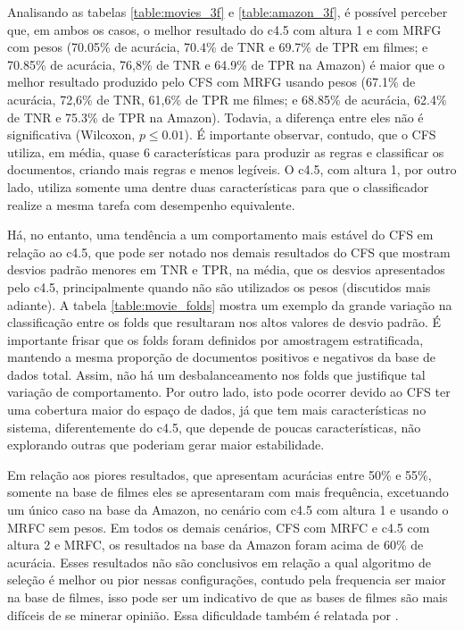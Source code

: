 \documentclass[template.tex]{subfiles}
\begin{document}
Analisando as tabelas \ref{table:movies_3f} e \ref{table:amazon_3f}, é possível perceber que, em ambos os casos, o melhor resultado do c4.5 com altura 1 e com MRFG com pesos (70.05\% de acurácia, 70.4\% de TNR e 69.7\% de TPR em filmes; e 70.85\% de acurácia, 76,8\% de TNR e 64.9\% de TPR na Amazon) é maior que o melhor resultado produzido pelo CFS com MRFG usando pesos (67.1\% de acurácia, 72,6\% de TNR, 61,6\% de TPR me filmes; e 68.85\% de acurácia, 62.4\% de TNR e 75.3\% de TPR na Amazon). Todavia, a diferença entre eles não é significativa (Wilcoxon, $p\leq0.01$). É importante observar, contudo, que o CFS utiliza, em média, quase 6 características para produzir as regras e classificar os documentos, criando mais regras e menos legíveis. O c4.5, com altura 1, por outro lado, utiliza somente uma dentre duas características para que o classificador realize a mesma tarefa com desempenho equivalente. 
 
Há, no entanto, uma tendência a um comportamento mais estável do CFS em relação ao c4.5, que pode ser notado nos demais resultados do CFS que mostram desvios padrão menores em TNR e TPR,  na média, que os desvios apresentados pelo c4.5, principalmente quando não são utilizados os pesos (discutidos mais adiante). A tabela \ref{table:movie_folds} mostra um exemplo da grande variação na classificação entre os folds que resultaram nos altos valores de desvio padrão. É importante frisar que os folds foram definidos por amostragem estratificada, mantendo a mesma proporção de documentos positivos e negativos da base de dados total. Assim, não há um desbalanceamento nos folds que justifique tal variação de comportamento. Por outro lado, isto pode ocorrer devido ao CFS ter uma cobertura maior do espaço de dados, já que tem mais características no sistema, diferentemente do c4.5, que depende de poucas características, não explorando outras que poderiam gerar maior estabilidade.

Em relação aos piores resultados, que apresentam acurácias entre 50\% e 55\%, somente na base de filmes eles se apresentaram com mais frequência, excetuando um único caso na base da Amazon, no cenário com c4.5 com altura 1 e usando o MRFC sem pesos. Em todos os demais cenários, CFS com MRFC e c4.5 com altura 2 e MRFC, os resultados na base da Amazon foram acima de 60\% de acurácia. Esses resultados não são conclusivos em relação a qual algoritmo de seleção é melhor ou pior nessas configurações, contudo pela frequencia ser maior na base de filmes, isso pode ser um indicativo de que as bases de filmes são mais difíceis de se minerar opinião. Essa dificuldade também é relatada por  .
\end{document}
